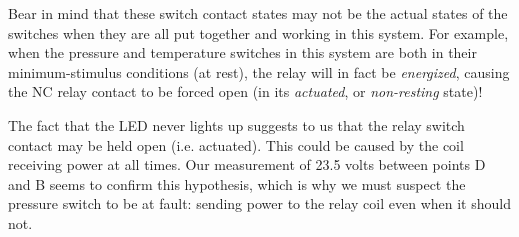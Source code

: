 Bear in mind that these switch contact states may not be the actual states of the switches when they are all put together and working in this system.  For example, when the pressure and temperature switches in this system are both in their minimum-stimulus conditions (at rest), the relay will in fact be {\it energized}, causing the NC relay contact to be forced open (in its {\it actuated}, or {\it non-resting} state)!

The fact that the LED never lights up suggests to us that the relay switch contact may be held open (i.e. actuated).  This could be caused by the coil receiving power at all times.  Our measurement of 23.5 volts between points D and B seems to confirm this hypothesis, which is why we must suspect the pressure switch to be at fault: sending power to the relay coil even when it should not.





